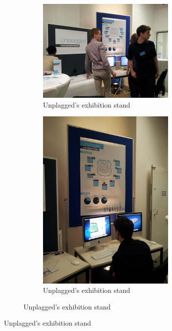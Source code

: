 \begin{figure}[!hbtp]
\pagebreak 

\begin{figure}[!hbtp]

\begin{figure}[!h]
  \centering
    \includegraphics[width=0.97\textwidth]{images/unplagged_exhibition_stand2.jpg}
  \caption{Unplagged's exhibition stand}
  \label{fig:unplagged_exhibition_stand2}
\end{figure}

\begin{figure}[!h]

  \centering
    \includegraphics[width=0.97\textwidth]{images/unplagged_exhibition_stand3.jpg}
  \caption{Unplagged's exhibition stand}
  \label{fig:unplagged_exhibition_stand3}
\end{figure}



\end{figure}
\end{figure}
